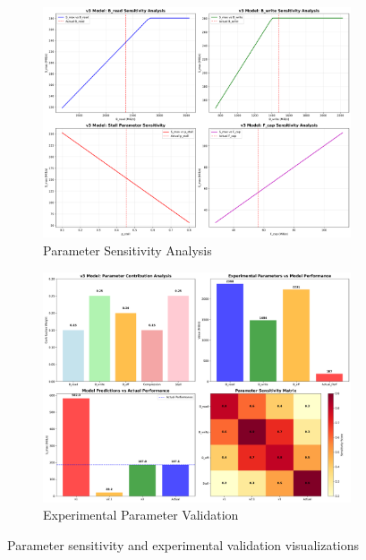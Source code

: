 \documentclass[11pt]{article}
\begin{document}
\begin{figure}[H]
\centering
\begin{subfigure}{0.48\textwidth}
\centering
\includegraphics[width=\textwidth]{experiments/2025-09-05/v3_parameter_sensitivity_analysis.png}
\caption{Parameter Sensitivity Analysis}
\label{fig:parameter_sensitivity}
\end{subfigure}
\hfill
\begin{subfigure}{0.48\textwidth}
\centering
\includegraphics[width=\textwidth]{experiments/2025-09-05/experimental_parameter_validation.png}
\caption{Experimental Parameter Validation}
\label{fig:experimental_validation}
\end{subfigure}
\caption{Parameter sensitivity and experimental validation visualizations}
\end{figure}
\end{document}
